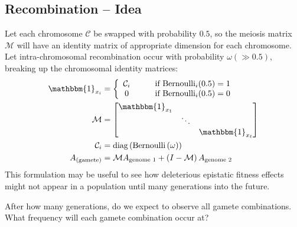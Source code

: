 \documentclass[11 pt]{article}
\newcommand{\1}{\mathbbm{1}}
\begin{document}
      \subsection{Recombination -- Idea}

      Let each chromosome $\mathcal{C}$ be swapped with probability $0.5$, so the meiosis matrix $\mathcal{M}$ will have an identity matrix of appropriate dimension for each chromosome. Let intra-chromosomal recombination occur with probability $\omega \left(\gg 0.5 \right)$, breaking up the chromosomal identity matrices:
        \begin{align*}
          \mathbbm{1}_{x_{i}} &= \left\{ \begin{array}{cc} \mathcal{C}_{i} \qquad &\text{if Bernoulli}_{i}(0.5) = 1 \\ 0 \qquad &\text{if Bernoulli}_{i}(0.5) = 0 \end{array} \right. \\
            \mathcal{M} &= \begin{bmatrix} \mathbbm{1}_{x_{1}} &  & \\ & \ddots & \\ & & \mathbbm{1}_{x_{\ell}} \end{bmatrix} \\
              \mathcal{C}_{i} &= \text{diag}\left(\text{Bernoulli}\left( \omega \right) \right) \\
            A_{(\text{gamete})} &= \mathcal{M} A_{\text{genome }1} + \left(I - \mathcal{M} \right) A_{\text{genome }2}
        \end{align*}
        This formulation may be useful to see how deleterious epistatic fitness effects might not appear in a population until many generations into the future.

        After how many generations, do we expect to observe all gamete combinations. What frequency will each gamete combination occur at? 
\end{document}
